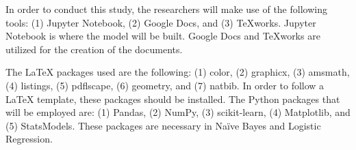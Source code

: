 \documentclass[runningheads]{llncs}
\begin{document}
In order to conduct this study, the researchers will make use of the following tools: (1) Jupyter Notebook, (2) Google Docs, and (3) TeXworks. Jupyter Notebook is where the model will be built. Google Docs and TeXworks are utilized for the creation of the documents. 

The LaTeX packages used are the following: (1) color, (2) graphicx, (3) amsmath, (4) listings, (5) pdflscape, (6) geometry, and (7) natbib. In order to follow a LaTeX template, these packages should be installed. The Python packages that will be employed are: (1) Pandas, (2) NumPy, (3) scikit-learn, (4) Matplotlib, and (5) StatsModels. These packages are necessary in Naïve Bayes and Logistic Regression. 



\end{document}
